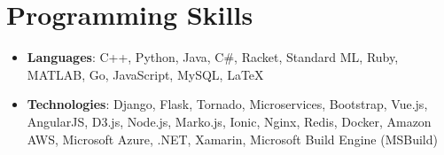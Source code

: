 \documentclass[letterpaper,11pt]{article}
\newcommand{\resumeItem}[2]{
  \item\small{
    \textbf{#1}{: #2 \vspace{-2pt}}
  }
}
\newcommand{\resumeSubItem}[2]{\resumeItem{#1}{#2}\vspace{-4pt}}
\newcommand{\resumeSubHeadingListStart}{\begin{itemize}[leftmargin=*]}
\newcommand{\resumeSubHeadingListEnd}{\end{itemize}}
\begin{document}
\section{Programming Skills}
  \resumeSubHeadingListStart
    \resumeSubItem{Languages}
      {C++, Python, Java, C\#, Racket, Standard ML, Ruby, MATLAB, Go, JavaScript, MySQL, \LaTeX} \\
    \resumeSubItem{Technologies}
      {Django, Flask, Tornado, Microservices, Bootstrap, Vue.js, AngularJS, D3.js, Node.js, Marko.js, Ionic, Nginx, Redis, Docker, Amazon AWS, Microsoft Azure, .NET, Xamarin, Microsoft Build Engine (MSBuild)} \\
  \resumeSubHeadingListEnd


\end{document}
